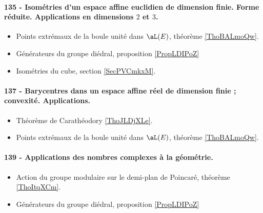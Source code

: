\paragraph{135 - Isométries d'un espace affine euclidien de dimension finie. Forme réduite. Applications en dimensions $2$ et $3$.}
\begin{itemize}
    \item Points extrémaux de la boule unité dans \( \aL(E)\), théorème \ref{ThoBALmoQw}.
    \item Générateurs du groupe diédral, proposition \ref{PropLDIPoZ}
    \item Isométries du cube, section \ref{SecPVCmkxM}.
\end{itemize}
\paragraph{137 - Barycentres dans un espace affine réel de dimension finie ; convexité. Applications.}
\begin{itemize}
    \item Théorème de Carathéodory \ref{ThoJLDjXLe}.
    \item Points extrémaux de la boule unité dans \( \aL(E)\), théorème \ref{ThoBALmoQw}.
\end{itemize}
\paragraph{139 - Applications des nombres complexes à la géométrie.}
\begin{itemize}
    \item Action du groupe modulaire sur le demi-plan de Poincaré, théorème \ref{ThoItqXCm}.
    \item Générateurs du groupe diédral, proposition \ref{PropLDIPoZ}
\end{itemize}
